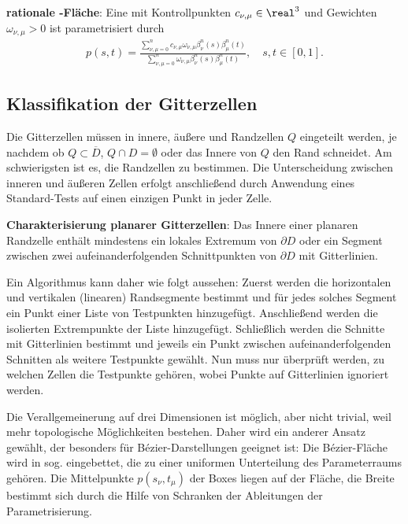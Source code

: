 \textbf{rationale -Fläche}:
Eine  mit Kontrollpunkten $c_{\nu,\mu} \in \real^3$ und
Gewichten $\omega_{\nu,\mu} > 0$ ist parametrisiert durch
\begin{align*}
    p(s, t) = \frac{\sum_{\nu,\mu=0}^n c_{\nu,\mu} \omega_{\nu,\mu} \beta_\nu^n(s) \beta_\mu^n(t)}
    {\sum_{\nu,\mu=0}^n \omega_{\nu,\mu} \beta_\nu^n(s) \beta_\mu^n(t)},\quad
    s, t \in [0, 1].
\end{align*}

\subsection{%
    Klassifikation der Gitterzellen%
}

Die Gitterzellen müssen in innere, äußere und Randzellen $Q$ eingeteilt werden, je nachdem
ob $Q \subset \overline{D}$, $Q \cap D = \emptyset$ oder das Innere von $Q$ den Rand schneidet.
Am schwierigsten ist es, die Randzellen zu bestimmen.
Die Unterscheidung zwischen inneren und äußeren Zellen erfolgt anschließend durch Anwendung
eines Standard-Tests auf einen einzigen Punkt in jeder Zelle.

\textbf{Charakterisierung planarer Gitterzellen}:
Das Innere einer planaren Randzelle enthält mindestens ein lokales Extremum von $\partial D$
oder ein Segment zwischen zwei aufeinanderfolgenden Schnittpunkten von $\partial D$ mit
Gitterlinien.

Ein Algorithmus kann daher wie folgt aussehen:
Zuerst werden die horizontalen und vertikalen (linearen) Randsegmente bestimmt
und für jedes solches Segment ein Punkt einer Liste von Testpunkten hinzugefügt.
Anschließend werden die isolierten Extrempunkte der Liste hinzugefügt.
Schließlich werden die Schnitte mit Gitterlinien bestimmt und jeweils ein Punkt zwischen
aufeinanderfolgenden Schnitten als weitere Testpunkte gewählt.
Nun muss nur überprüft werden, zu welchen Zellen die Testpunkte gehören,
wobei Punkte auf Gitterlinien ignoriert werden.

\linie
\pagebreak

Die Verallgemeinerung auf drei Dimensionen ist möglich, aber nicht trivial,
weil mehr topologische Möglichkeiten bestehen.
Daher wird ein anderer Ansatz gewählt, der besonders für Bézier-Darstellungen geeignet ist:
Die Bézier-Fläche wird in sog.
 eingebettet, die zu einer uniformen Unterteilung
des Parameterraums gehören.
Die Mittelpunkte $p(s_\nu, t_\mu)$ der Boxes liegen auf der Fläche,
die Breite bestimmt sich durch die Hilfe von Schranken der Ableitungen der Parametrisierung.

